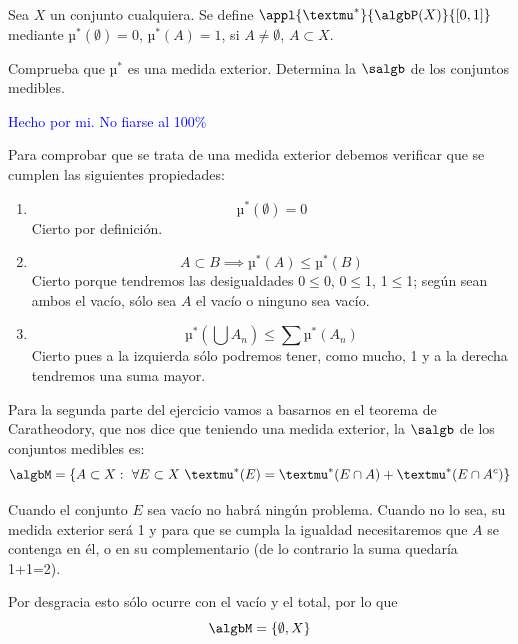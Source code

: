 \begin{problem}[12]
Sea $X$ un conjunto cualquiera. Se define $\appl{µ^*}{\algbP(X)}{[0,1]}$ mediante $µ^*(\emptyset)=0$, $µ^*(A)=1$, si $A \neq \emptyset$, $A\subset X$.

Comprueba que $µ^*$ es una medida exterior. Determina la $\salgb$ de los conjuntos medibles.

\solution
\textcolor{blue}{Hecho por mi. No fiarse al 100\%}

Para comprobar que se trata de una medida exterior debemos verificar que se cumplen las siguientes propiedades:
\begin{enumerate}
\item
\[µ^*(\emptyset)=0\]
Cierto por definición.
\item
\[A \subset B \implies µ^*(A)\leq µ^*(B)\]
Cierto porque tendremos las desigualdades 0$\leq$0, 0$\leq$1, 1$\leq$1; según sean ambos el vacío, sólo sea $A$ el vacío o ninguno sea vacío.
\item
\[µ^*(\bigcup A_n) \leq \sum µ^*(A_n)\]
Cierto pues a la izquierda sólo podremos tener, como mucho, 1 y a la derecha tendremos una suma mayor.
\end{enumerate}

Para la segunda parte del ejercicio vamos a basarnos en el teorema de Caratheodory, que nos dice que teniendo una medida exterior, la $\salgb$ de los conjuntos medibles es:
\[\algbM = \{A \subset X: \ \forall E \subset X \ µ^*(E)=µ^*(E \cap A) + µ^*(E \cap A^c)\}\]

Cuando el conjunto $E$ sea vacío no habrá ningún problema. Cuando no lo sea, su medida exterior será 1 y para que se cumpla la igualdad necesitaremos que $A$ se contenga en él, o en su complementario (de lo contrario la suma quedaría 1+1=2).

Por desgracia esto sólo ocurre con el vacío y el total, por lo que
\[\algbM = \{\emptyset, X\}\]
\end{problem}

